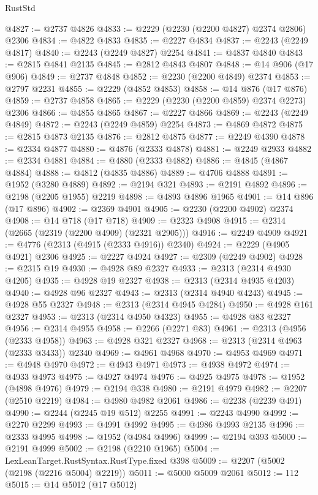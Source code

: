 \begin{lexlean}{RustStd}
\begin{coremodule}
@4827 := @2737 @4826
@4833 := @2229 (@2230 (@2200 @4827) @2374 @2806) @2306
@4834 := @4822 @4833
@4835 := @2227 @4834
@4837 := @2243 (@2249 @4817)
@4840 := @2243 (@2249 @4827) @2254
@4841 := @4837 @4840
@4843 := @2815 @4841 @2135
@4845 := @2812 @4843 @4807
@4848 := @14 @906 (@17 @906)
@4849 := @2737 @4848
@4852 := @2230 (@2200 @4849) @2374
@4853 := @2797 @2231
@4855 := @2229 (@4852 @4853)
@4858 := @14 @876 (@17 @876)
@4859 := @2737 @4858
@4865 := @2229 (@2230 (@2200 @4859) @2374 @2273) @2306
@4866 := @4855 @4865
@4867 := @2227 @4866
@4869 := @2243 (@2249 @4849)
@4872 := @2243 (@2249 @4859) @2254
@4873 := @4869 @4872
@4875 := @2815 @4873 @2135
@4876 := @2812 @4875
@4877 := @2249 @4390
@4878 := @2334 @4877
@4880 := @4876 (@2333 @4878)
@4881 := @2249 @2933
@4882 := @2334 @4881
@4884 := @4880 (@2333 @4882)
@4886 := @4845 (@4867 @4884)
@4888 := @4812 (@4835 @4886)
@4889 := @4706 @4888
@4891 := @1952 (@3280 @4889)
@4892 := @2194 @321
@4893 := @2191 @4892
@4896 := @2198 (@2205 @1955) @2219
@4898 := @4893 @4896 @1965
@4901 := @14 @896 (@17 @896)
@4902 := @2369 @4901
@4905 := @2230 (@2200 @4902) @2374
@4908 := @14 @718 (@17 @718)
@4909 := @2323 @4908
@4915 := @2314 (@2665 (@2319 (@2200 @4909) (@2321 @2905)))
@4916 := @2249 @4909
@4921 := @4776 (@2313 (@4915 (@2333 @4916)) @2340)
@4924 := @2229 (@4905 @4921) @2306
@4925 := @2227 @4924
@4927 := @2309 (@2249 @4902)
@4928 := @2315 @19
@4930 := @4928 @89 @2327
@4933 := @2313 (@2314 @4930 @4205)
@4935 := @4928 @19 @2327
@4938 := @2313 (@2314 @4935 @4203)
@4940 := @4928 @96 @2327
@4943 := @2313 (@2314 @4940 @4243)
@4945 := @4928 @55 @2327
@4948 := @2313 (@2314 @4945 @4284)
@4950 := @4928 @161 @2327
@4953 := @2313 (@2314 @4950 @4323)
@4955 := @4928 @83 @2327
@4956 := @2314 @4955
@4958 := @2266 (@2271 @83)
@4961 := @2313 (@4956 (@2333 @4958))
@4963 := @4928 @321 @2327
@4968 := @2313 (@2314 @4963 (@2333 @3433)) @2340
@4969 := @4961 @4968
@4970 := @4953 @4969
@4971 := @4948 @4970
@4972 := @4943 @4971
@4973 := @4938 @4972
@4974 := @4933 @4973
@4975 := @4927 @4974
@4976 := @4925 @4975
@4978 := @1952 (@4898 @4976)
@4979 := @2194 @338
@4980 := @2191 @4979
@4982 := @2207 (@2510 @2219)
@4984 := @4980 @4982 @2061
@4986 := @2238 (@2239 @491)
@4990 := @2244 (@2245 @19 @512) @2255
@4991 := @2243 @4990
@4992 := @2270 @2299
@4993 := @4991 @4992
@4995 := @4986 @4993 @2135
@4996 := @2333 @4995
@4998 := @1952 (@4984 @4996)
@4999 := @2194 @393
@5000 := @2191 @4999
@5002 := @2198 (@2210 @1965)
@5004 := LexLeanTarget.RustSyntax.RustType.fixed @398
@5009 := @2207 (@5002 (@2198 (@2216 @5004) @2219))
@5011 := @5000 @5009 @2061
@5012 := 112
@5015 := @14 @5012 (@17 @5012)

\end{coremodule}
\end{lexlean}
